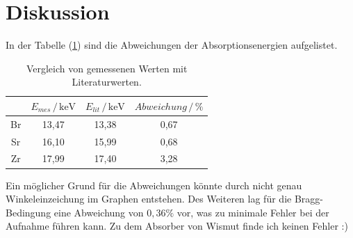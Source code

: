 \section{Diskussion}
In der Tabelle (\ref{tab:3}) sind die Abweichungen der Absorptionsenergien aufgelistet.
\begin{table}
  \centering
  \caption{Vergleich von gemessenen Werten mit Literaturwerten.}
  \label{tab:3}
  \begin{tabular}{c c c c}
    \toprule
     & $E_{mes}\,/ \, \text{keV}$  & $E_{lit}\,/ \, \text{keV}$ & $Abweichung \,/\,\%$ \\
    \midrule
    Br & 13,47 & 13,38 & 0,67\\
    Sr & 16,10 & 15,99 & 0,68\\
    Zr & 17,99 & 17,40 & 3,28\\
    \bottomrule
  \end{tabular}
\end{table}
Ein möglicher Grund für die Abweichungen könnte durch nicht genau Winkeleinzeichung im Graphen entstehen.
Des Weiteren lag für die Bragg-Bedingung eine Abweichung von $0,36\%$ vor, was zu minimale Fehler bei der
Aufnahme führen kann.
Zu dem Absorber von Wismut finde ich keinen Fehler :)

\newpage

